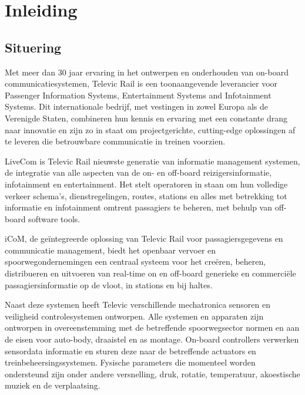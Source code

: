 \chapter{Inleiding}\label{hfdst:situering}
\section{Situering}
Met meer dan 30 jaar ervaring in het ontwerpen en onderhouden van on-board communicatiesystemen, Televic Rail is een toonaangevende leverancier voor Passenger Information Systems, Entertainment Systems and Infotainment Systems.
Dit internationale bedrijf, met vestingen in zowel Europa als de Verenigde Staten, combineren hun kennis en ervaring met een constante drang naar innovatie en zijn zo in staat om projectgerichte, cutting-edge oplossingen af te leveren die betrouwbare communicatie in treinen voorzien.

LiveCom is Televic Rail nieuwste generatie van informatie management systemen, de integratie van alle aspecten van de on- en off-board reizigersinformatie, infotainment en entertainment. 
Het stelt operatoren in staan om hun volledige verkeer schema's, dienstregelingen, routes, stations en alles met betrekking tot informatie en infotainment omtrent passagiers te beheren, met behulp van off-board software tools.

iCoM, de geïntegreerde oplossing van Televic Rail voor passagiersgegevens en communicatie management, biedt het openbaar vervoer en spoorwegondernemingen een centraal systeem voor het creëren, beheren, distribueren en uitvoeren van real-time on en off-board generieke en commerciële passagiersinformatie op de vloot, in stations en bij haltes.

Naast deze systemen heeft Televic verschillende mechatronica sensoren en veiligheid controlesystemen ontworpen.
Alle systemen en apparaten zijn ontworpen in overeenstemming met de betreffende spoorwegsector normen en aan de eisen voor auto-body, draaistel en as montage. 
On-board controllers verwerken sensordata informatie en sturen deze naar de betreffende actuators en treinbeheersingssystemen.
Fysische parameters die momenteel worden ondersteund zijn onder andere versnelling, druk, rotatie, temperatuur, akoestische muziek en de verplaatsing.

